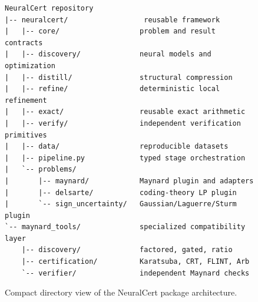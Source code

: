 
\begin{figure}[tbp]
  \centering
  \begin{minipage}{0.96\linewidth}
  \small
  \begin{verbatim}
NeuralCert repository
|-- neuralcert/                  reusable framework
|   |-- core/                   problem and result contracts
|   |-- discovery/              neural models and optimization
|   |-- distill/                structural compression
|   |-- refine/                 deterministic local refinement
|   |-- exact/                  reusable exact arithmetic
|   |-- verify/                 independent verification primitives
|   |-- data/                   reproducible datasets
|   |-- pipeline.py             typed stage orchestration
|   `-- problems/
|       |-- maynard/            Maynard plugin and adapters
|       |-- delsarte/           coding-theory LP plugin
|       `-- sign_uncertainty/   Gaussian/Laguerre/Sturm plugin
`-- maynard_tools/              specialized compatibility layer
    |-- discovery/              factored, gated, ratio
    |-- certification/          Karatsuba, CRT, FLINT, Arb
    `-- verifier/               independent Maynard checks
  \end{verbatim}
  \end{minipage}
  \caption{Compact directory view of the NeuralCert package architecture.}
  \label{fig:neuralcert-package-tree}
\end{figure}

